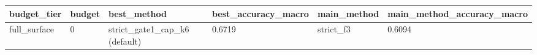 \begin{tabular}{llllll}
\hline
budget\_tier & budget & best\_method & best\_accuracy\_macro & main\_method & main\_method\_accuracy\_macro \\
\hline
full\_surface & 0 & strict\_gate1\_cap\_k6 (default) & 0.6719 & strict\_f3 & 0.6094 \\
\hline
\end{tabular}
